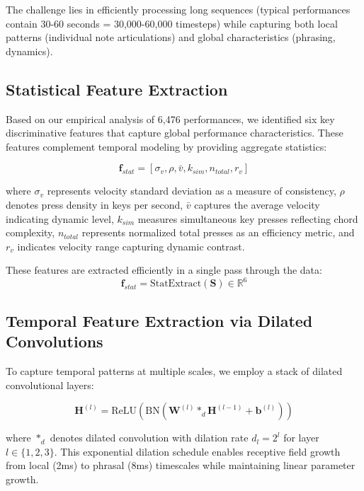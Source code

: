 \documentclass[sigconf,review,anonymous]{acmart}
\begin{document}
The challenge lies in efficiently processing long sequences (typical performances contain 30-60 seconds = 30,000-60,000 timesteps) while capturing both local patterns (individual note articulations) and global characteristics (phrasing, dynamics).

\subsection{Statistical Feature Extraction}

Based on our empirical analysis of 6,476 performances, we identified six key discriminative features that capture global performance characteristics. These features complement temporal modeling by providing aggregate statistics:

\begin{equation}
\mathbf{f}_{stat} = [\sigma_v, \rho, \bar{v}, k_{sim}, n_{total}, r_v]
\end{equation}

where $\sigma_v$ represents velocity standard deviation as a measure of consistency, $\rho$ denotes press density in keys per second, $\bar{v}$ captures the average velocity indicating dynamic level, $k_{sim}$ measures simultaneous key presses reflecting chord complexity, $n_{total}$ represents normalized total presses as an efficiency metric, and $r_v$ indicates velocity range capturing dynamic contrast.

These features are extracted efficiently in a single pass through the data:
\begin{equation}
\mathbf{f}_{stat} = \text{StatExtract}(\mathbf{S}) \in \mathbb{R}^6
\end{equation}

\subsection{Temporal Feature Extraction via Dilated Convolutions}

To capture temporal patterns at multiple scales, we employ a stack of dilated convolutional layers:

\begin{equation}
\mathbf{H}^{(l)} = \text{ReLU}(\text{BN}(\mathbf{W}^{(l)} *_d \mathbf{H}^{(l-1)} + \mathbf{b}^{(l)}))
\end{equation}

where $*_d$ denotes dilated convolution with dilation rate $d_l = 2^l$ for layer $l \in \{1,2,3\}$. This exponential dilation schedule enables receptive field growth from local (2ms) to phrasal (8ms) timescales while maintaining linear parameter growth.
\end{document}
